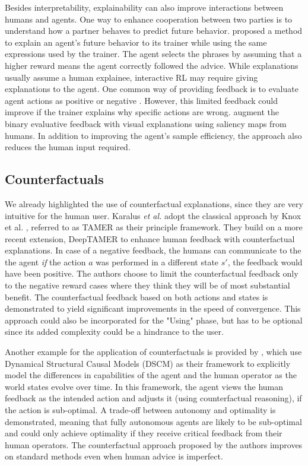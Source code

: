 \documentclass[twoside,11pt]{article}
\begin{document}
Besides interpretability, explainability can also improve interactions between humans and agents. One way to enhance cooperation between two parties is to understand how a partner behaves to predict future behavior. \cite{fukuchi2017autonomous} proposed a method to explain an agent's future behavior to its trainer while using the same expressions used by the trainer. The agent selects the phrases by assuming that a higher reward means the agent correctly followed the advice. While explanations usually assume a human explainee, interactive RL may require giving explanations to the agent. One common way of providing feedback is to evaluate agent actions as positive or negative \citep{Knox:2008:TAMER,knox:13,arakawa:18,macglashan2017interactive}. However, this limited feedback could improve if the trainer explains why specific actions are wrong. \cite{guan2020explanation} augment the binary evaluative feedback with visual explanations using saliency maps from humans. In addition to improving the agent's sample efficiency, the approach also reduces the human input required. 

\subsection{Counterfactuals}

We already highlighted the use of counterfactual explanations, since they are very intuitive for the human user. Karalus \emph{et al.} adopt the classical approach by Knox et al. \cite{Knox:2008:TAMER}, referred to as TAMER as their principle framework. They build on a more recent extension, DeepTAMER \cite{Warnell:2018:DeepTAMER} to enhance human feedback with counterfactual explanations. In case of a negative feedback, the humans can communicate to the the agent \emph{if} the action $a$ was performed in a different state $s'$, the feedback would have been positive. The authors choose to limit the counterfactual feedback only to the negative reward cases where they think they will be of most substantial benefit. The counterfactual feedback based on both actions and states is demonstrated to yield significant improvements in the speed of convergence. This approach could also be incorporated for the "Using" phase, but has to be optional since its added complexity could be a hindrance to the user.

Another example for the application of counterfactuals is provided by \cite{Pearl:2009:Causality}, which use Dynamical Structural Causal Models (DSCM) as their framework to explicitly model the differences in capabilities of the agent and the human operator as the world states evolve over time. In this framework, the agent views the human feedback as the intended action and adjusts it (using counterfactual reasoning), if the action is sub-optimal. A trade-off between autonomy and optimality is demonstrated, meaning that fully autonomous agents are likely to be sub-optimal and could only achieve optimality if they receive critical feedback from their human operators. The counterfactual approach proposed by the authors improves on standard methods even when human advice is imperfect.
\end{document}
